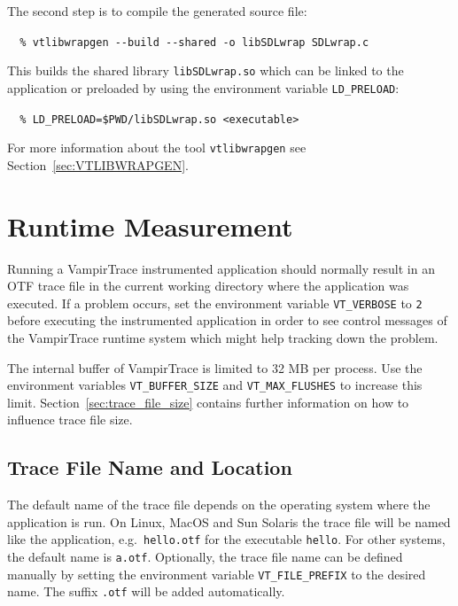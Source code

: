 \documentclass[a4paper,twoside,12pt,BCOR12mm]{scrbook}
\newcommand{\pathname}[1]{\nolinkurl{#1}}  %
\renewcommand{\pathname}[1]{\texttt{#1}}   %
\begin{document}
  The second step is to compile the generated source file:
	
  \vspace{1ex}
  \verb|  % vtlibwrapgen --build --shared -o libSDLwrap SDLwrap.c|
  \vspace{1ex}

  This builds the shared library \texttt{libSDLwrap.so} which can be linked to the application
  or preloaded by using the environment variable \texttt{LD\_PRELOAD}:

  \vspace{1ex}
  \verb|  % LD_PRELOAD=$PWD/libSDLwrap.so <executable>|
  \vspace{1ex}

  For more information about the tool \texttt{vtlibwrapgen} see Section~\ref{sec:VTLIBWRAPGEN}.
	

\chapter{Runtime Measurement}
\label{chap:runtime_measurement}

Running a VampirTrace instrumented application should normally result in an
OTF trace file in the current working directory where the application was
executed. If a problem occurs, set the environment variable
\texttt{VT\_VERBOSE} to \texttt{2} before executing the instrumented application
in order to see control messages of the VampirTrace runtime system which might
help tracking down the problem.

The internal buffer of VampirTrace is limited to 32 MB per process. Use the environment
variables \texttt{VT\_BUFFER\_SIZE} and \texttt{VT\_MAX\_FLUSHES} to increase
this limit. Section~\ref{sec:trace_file_size} contains further information on
how to influence trace file size.


\section{Trace File Name and Location}
\label{sec:tracefilename}

The default name of the trace file depends on the operating system where the
application is run. On Linux, MacOS and Sun Solaris the trace file will
be named like the application, e.g.~\pathname{hello.otf} for the executable \pathname{hello}.
For other systems, the default name is \pathname{a.otf}.
Optionally, the trace file name can be defined manually by setting the environment
variable \texttt{VT\_FILE\_PREFIX} to the desired name. The suffix \texttt{.otf}
will be added automatically.
\end{document}
